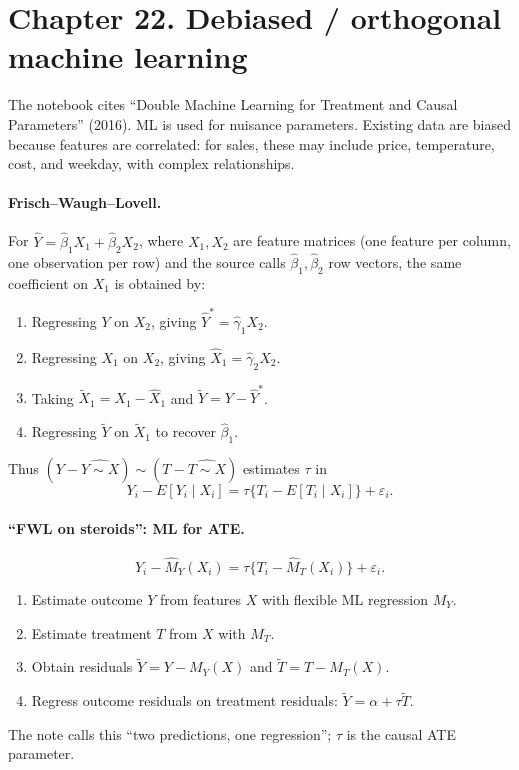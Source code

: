 {\section{Chapter 22. Debiased / orthogonal machine learning}
The notebook cites ``Double Machine Learning for Treatment and Causal Parameters'' (2016). ML is used for nuisance parameters. Existing data are biased because features are correlated: for sales, these may include price, temperature, cost, and weekday, with complex relationships.

\paragraph{Frisch--Waugh--Lovell.}
For $\hat Y=\hat\beta_1X_1+\hat\beta_2X_2$, where $X_1,X_2$ are feature matrices (one feature per column, one observation per row) and the source calls $\hat\beta_1,\hat\beta_2$ row vectors, the same coefficient on $X_1$ is obtained by:
\begin{enumerate}
\item Regressing $Y$ on $X_2$, giving $\hat Y^*=\hat\gamma_1X_2$.
\item Regressing $X_1$ on $X_2$, giving $\hat X_1=\hat\gamma_2X_2$.
\item Taking $\widetilde X_1=X_1-\hat X_1$ and $\widetilde Y=Y-\hat Y^*$.
\item Regressing $\widetilde Y$ on $\widetilde X_1$ to recover $\hat\beta_1$.
\end{enumerate}
Thus $(Y-\widehat{Y\sim X})\sim(T-\widehat{T\sim X})$ estimates $\tau$ in
\[Y_i-E[Y_i\mid X_i]=\tau\{T_i-E[T_i\mid X_i]\}+\varepsilon_i.\]

\paragraph{``FWL on steroids'': ML for ATE.}
\[Y_i-\hat M_Y(X_i)=\tau\{T_i-\hat M_T(X_i)\}+\varepsilon_i.\]
 
\begin{enumerate}
\item Estimate outcome $Y$ from features $X$ with flexible ML regression $M_Y$.
\item Estimate treatment $T$ from $X$ with $M_T$.
\item Obtain residuals $\widetilde Y=Y-M_Y(X)$ and $\widetilde T=T-M_T(X)$.
\item Regress outcome residuals on treatment residuals: $\widetilde Y=\alpha+\tau\widetilde T$.
\end{enumerate}
The note calls this ``two predictions, one regression''; $\tau$ is the causal ATE parameter.

}
